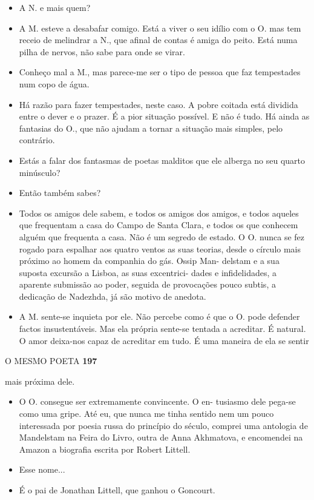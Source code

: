 \begin{itemize}
\tightlist
\item
  A N. e mais quem?
\item
  A M. esteve a desabafar comigo. Está a viver o seu idílio com o O. mas
  tem receio de melindrar a N., que afinal de contas é amiga do peito.
  Está numa pilha de nervos, não sabe para onde se virar.
\item
  Conheço mal a M., mas parece-me ser o tipo de pessoa que faz
  tempestades num copo de água.
\item
  Há razão para fazer tempestades, neste caso. A pobre coitada está
  dividida entre o dever e o prazer. É a pior situação possível. E não é
  tudo. Há ainda as fantasias do O., que não ajudam a tornar a situação
  mais simples, pelo contrário.
\item
  Estás a falar dos fantasmas de poetas malditos que ele alberga no seu
  quarto minúsculo?
\item
  Então também sabes?
\item
  Todos os amigos dele sabem, e todos os amigos dos amigos, e todos
  aqueles que frequentam a casa do Campo de Santa Clara, e todos os que
  conhecem alguém que frequenta a casa. Não é um segredo de estado. O O.
  nunca se fez rogado para espalhar aos quatro ventos as suas teorias,
  desde o círculo mais próximo ao homem da companhia do gás. Ossip Man-
  delstam e a sua suposta excursão a Lisboa, as suas excentrici- dades e
  infidelidades, a aparente submissão ao poder, seguida de provocações
  pouco subtis, a dedicação de Nadezhda, já são motivo de anedota.
\item
  A M. sente-se inquieta por ele. Não percebe como é que o O. pode
  defender factos insustentáveis. Mas ela própria sente-se tentada a
  acreditar. É natural. O amor deixa-nos capaz de acreditar em tudo. É
  uma maneira de ela se sentir
\end{itemize}

O MESMO POETA \textbf{197}

mais próxima dele.

\begin{itemize}
\tightlist
\item
  O O. consegue ser extremamente convincente. O en- tusiasmo dele
  pega-se como uma gripe. Até eu, que nunca me tinha sentido nem um
  pouco interessada por poesia russa do princípio do século, comprei uma
  antologia de Mandelstam na Feira do Livro, outra de Anna Akhmatova, e
  encomendei na Amazon a biografia escrita por Robert Littell.
\item
  Esse nome...
\item
  É o pai de Jonathan Littell, que ganhou o Goncourt.
\end{itemize}

